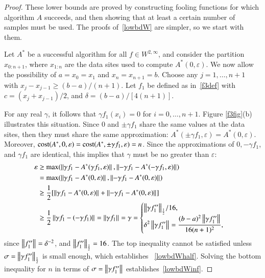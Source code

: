 \documentclass[review]{elsarticle}
\newcommand{\abstol}{\varepsilon}
\theoremstyle{definition}
\renewcommand{\cw}{W}
\begin{document}
\begin{proof}
	These lower bounds are proved by constructing fooling functions for which
	algorithm $A$ succeeds, and then showing that at least a certain number of
	samples must be used. The proofs of~\eqref{lowbdW} are simpler, so
	we start with them.
		
	Let $A^*$ be a successful algorithm for all $f \in \cw^{2,\infty}$, and consider
	the partition $x_{0:n+1}$, where $x_{1:n}$ are the data sites
	used to compute $A^*(0,\abstol)$.  We now allow the possibility of $a = x_0=x_1$
	and $x_n = x_{n+1} = b$. Choose any $j=1, \ldots, n+1$ with
	$x_j-x_{j-1} \ge (b-a)/(n+1)$. Let $f_1$ be defined as in~\eqref{f3def} with $c
	= (x_j+x_{j-1})/2$, and $\delta = (b-a)/[4(n+1)]$.
	
	For any real $\gamma$, it follows that $\gamma f_1(x_i)=0$ for $i=0, \ldots,
	n+1$. Figure \ref{f3fig}(b) illustrates this situation. Since $0$ and $\pm
	\gamma f_1$ share the same values at the data sites, then they must share the
	same approximation: $A^*(\pm \gamma f_1,\abstol) = A^*(0,\abstol)$. Moreover,
	$\cost(A^*,0,\abstol) = \cost(A^*,\pm \gamma f_1,\abstol) = n$. Since the
	approximations of $0, -\gamma f_1$, and $\gamma f_1$ are identical, this implies that
	$\gamma$
	must be no greater than $\abstol$:
	\begin{align*}
	\abstol  &\ge \max(\norm{\gamma f_1 - A^*(\gamma f_1,\abstol)},
	\norm{-\gamma f_1 - A^*(-\gamma f_1,\abstol)}) \\
	&= \max(\norm{\gamma f_1 - A^*(0,\abstol)}, \norm{-\gamma f_1 - A^*(0,\abstol)}) \\
	& \ge \frac{1}{2} [\norm{\gamma f_1 - A^*(0,\abstol)}
	+ \norm{-\gamma f_1 - A^*(0,\abstol)}] \\
	& \ge \frac{1}{2} \norm{\gamma f_1 - (-\gamma f_1)} =  \norm{\gamma f_1}
	= \gamma %
	= \begin{cases} \displaystyle { \norm[\frac 12]{\gamma f_1''}}/{16} , \\
	\displaystyle \delta^2 	\norm{\gamma f_1''}
	=  \frac{(b-a)^2 \norm{\gamma f_1''}}{16(n+1)^2},
	\end{cases}
	\end{align*}
	since $\norm{f_1''} =  \delta^{-2}$,  and $\norm[\frac 12]{f_1''} = 16$. The top inequality
	cannot be satisfied unless $\sigma = \norm[\frac 12]{\gamma
	f_1''}$ is small enough, which establishes ~\eqref{lowbdWhalf}. Solving the
	bottom inequality for $n$ in terms of $\sigma = \norm{\gamma f_1''}$
	establishes~\eqref{lowbdWinf}.



\end{proof}
\end{document}
